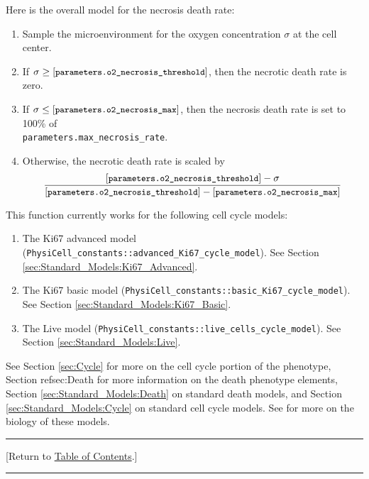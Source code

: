 \documentclass[12pt]{article}
\newcommand{\beq}{\begin{equation}}
\newcommand{\eeq}{\end{equation}}
\renewcommand{\v}{\verb}
\renewcommand{\tt}[1]{{\small \left[\texttt{#1}\right] }}
\newcommand{\TOClink}{\begin{center}\hrule\vskip-10pt\phantom{.}\hfill[Return to \hyperlink{TOC}{Table of Contents}.]\hfill\phantom{.}\vskip3pt\hrule\end{center}}
\begin{document}
Here is the overall model for the necrosis death rate: 
\begin{enumerate}
\item 
Sample the microenvironment for the oxygen concentration 
$\sigma$ at the 
cell center. 
\item 
If $\sigma \ge \tt{parameters.o2\_necrosis\_threshold}$, 
then the necrotic death rate is zero. 

\item 
If $\sigma \le \tt{parameters.o2\_necrosis\_max}$, 
then the necrosis death rate is set to 100\% of \\
\v|parameters.max_necrosis_rate|. 

\item 
Otherwise, the necrotic death rate is scaled by 
\beq
\frac{ \tt{parameters.o2\_necrosis\_threshold} - \sigma }
{\tt{parameters.o2\_necrosis\_threshold} - \tt{parameters.o2\_necrosis\_max} }
\eeq
\end{enumerate}

This function currently works for the following 
cell cycle models: 

\begin{enumerate}
\item 
The Ki67 advanced model 
(\v|PhysiCell_constants::advanced_Ki67_cycle_model|). See 
Section \ref{sec:Standard_Models:Ki67_Advanced}. 

\item 
The Ki67 basic model 
(\v|PhysiCell_constants::basic_Ki67_cycle_model|). See 
Section \ref{sec:Standard_Models:Ki67_Basic}. 

\item 
The Live model 
(\v|PhysiCell_constants::live_cells_cycle_model|). See 
Section \ref{sec:Standard_Models:Live}. 
\end{enumerate}

See Section \ref{sec:Cycle} for more on the cell cycle portion 
of the phenotype, Section ref{sec:Death} for more information 
on the death phenotype elements, 
Section \ref{sec:Standard_Models:Death} on standard death models, and  
Section \ref{sec:Standard_Models:Cycle} on standard cell cycle models. 
See \cite{ref:PhysiCell} for more on the biology of these 
models. 

\TOClink 
\end{document}
